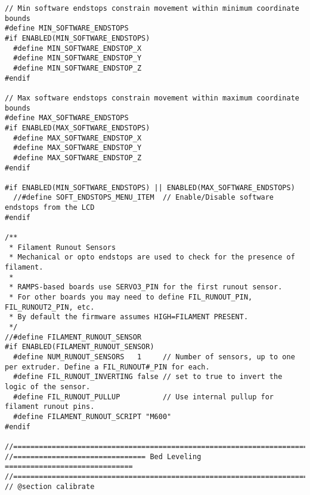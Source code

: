 \begin{lstlisting}[caption = キャプション, label = ラベル]
// Min software endstops constrain movement within minimum coordinate bounds
#define MIN_SOFTWARE_ENDSTOPS
#if ENABLED(MIN_SOFTWARE_ENDSTOPS)
  #define MIN_SOFTWARE_ENDSTOP_X
  #define MIN_SOFTWARE_ENDSTOP_Y
  #define MIN_SOFTWARE_ENDSTOP_Z
#endif

// Max software endstops constrain movement within maximum coordinate bounds
#define MAX_SOFTWARE_ENDSTOPS
#if ENABLED(MAX_SOFTWARE_ENDSTOPS)
  #define MAX_SOFTWARE_ENDSTOP_X
  #define MAX_SOFTWARE_ENDSTOP_Y
  #define MAX_SOFTWARE_ENDSTOP_Z
#endif

#if ENABLED(MIN_SOFTWARE_ENDSTOPS) || ENABLED(MAX_SOFTWARE_ENDSTOPS)
  //#define SOFT_ENDSTOPS_MENU_ITEM  // Enable/Disable software endstops from the LCD
#endif

/**
 * Filament Runout Sensors
 * Mechanical or opto endstops are used to check for the presence of filament.
 *
 * RAMPS-based boards use SERVO3_PIN for the first runout sensor.
 * For other boards you may need to define FIL_RUNOUT_PIN, FIL_RUNOUT2_PIN, etc.
 * By default the firmware assumes HIGH=FILAMENT PRESENT.
 */
//#define FILAMENT_RUNOUT_SENSOR
#if ENABLED(FILAMENT_RUNOUT_SENSOR)
  #define NUM_RUNOUT_SENSORS   1     // Number of sensors, up to one per extruder. Define a FIL_RUNOUT#_PIN for each.
  #define FIL_RUNOUT_INVERTING false // set to true to invert the logic of the sensor.
  #define FIL_RUNOUT_PULLUP          // Use internal pullup for filament runout pins.
  #define FILAMENT_RUNOUT_SCRIPT "M600"
#endif

//===========================================================================
//=============================== Bed Leveling ==============================
//===========================================================================
// @section calibrate


\end{lstlisting}
